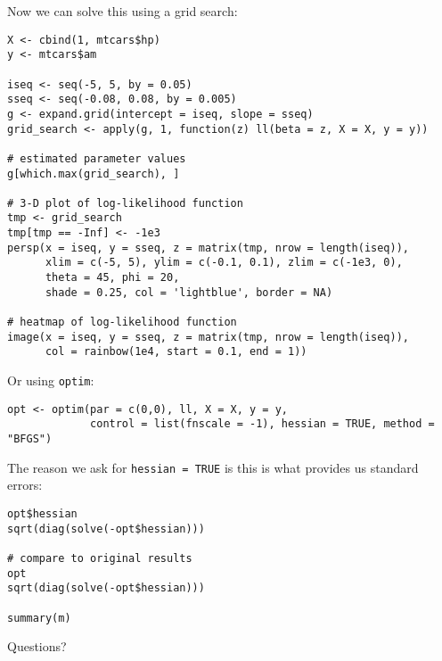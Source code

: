 \documentclass[a4paper,12pt]{article}
\begin{document}
Now we can solve this using a grid search:

\begin{lstlisting}
X <- cbind(1, mtcars$hp)
y <- mtcars$am

iseq <- seq(-5, 5, by = 0.05)
sseq <- seq(-0.08, 0.08, by = 0.005)
g <- expand.grid(intercept = iseq, slope = sseq)
grid_search <- apply(g, 1, function(z) ll(beta = z, X = X, y = y))

# estimated parameter values
g[which.max(grid_search), ]

# 3-D plot of log-likelihood function
tmp <- grid_search
tmp[tmp == -Inf] <- -1e3
persp(x = iseq, y = sseq, z = matrix(tmp, nrow = length(iseq)), 
      xlim = c(-5, 5), ylim = c(-0.1, 0.1), zlim = c(-1e3, 0), 
      theta = 45, phi = 20, 
      shade = 0.25, col = 'lightblue', border = NA)

# heatmap of log-likelihood function
image(x = iseq, y = sseq, z = matrix(tmp, nrow = length(iseq)),
      col = rainbow(1e4, start = 0.1, end = 1))
\end{lstlisting}

Or using \texttt{optim}:

\begin{lstlisting}
opt <- optim(par = c(0,0), ll, X = X, y = y, 
             control = list(fnscale = -1), hessian = TRUE, method = "BFGS")
\end{lstlisting}


The reason we ask for \texttt{hessian = TRUE} is this is what provides us standard errors:

\begin{lstlisting}
opt$hessian
sqrt(diag(solve(-opt$hessian)))

# compare to original results
opt
sqrt(diag(solve(-opt$hessian)))

summary(m)
\end{lstlisting}

Questions?
\end{document}
